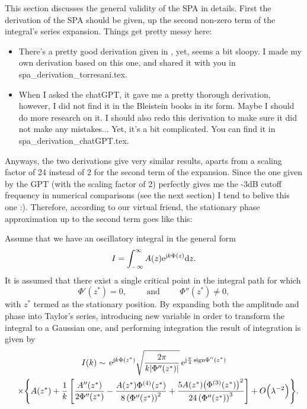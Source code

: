 \documentclass[11pt]{article}
\begin{document}
This section discusses the general validity of the SPA in details.
First the derivation of the SPA should be given, up the second non-zero term of the integral's series expansion.
Things get pretty messy here:
\begin{itemize}
\item There's a pretty good derivation given in \cite[p. 114-116]{torresani1995}, yet, seems a bit sloopy.
I made my own derivation based on this one, and shared it with you in spa\_derivation\_torresani.tex.
\item When I asked the chatGPT, it gave me a pretty thorough derivation, however, I did not find it in the Bleistein books in its form.
Maybe I should do more research on it. 
I should also redo this derivation to make sure it did not make any mistakes... Yet, it's a bit complicated. 
You can find it in spa\_derivation\_chatGPT.tex.
\end{itemize}
Anyways, the two derivations give very similar results, aparts from a scaling factor of 24 instead of 2 for the second term of the expansion.
Since the one given by the GPT (with the scaling factor of 2) perfectly gives me the -3dB cutoff frequency in numerical comparisons (see the next section) I tend to belive this one :).
Therefore, according to our virtual friend, the stationary phase approximation up to the second term goes like this:

Assume that we have an oscillatory integral in the general form
\begin{equation}
    I = \int_{-\infty}^{\infty} A(z) \mathrm{e}^{ \mathrm{j} k \Phi(z) }  \mathrm{d} z.
\end{equation}
It is assumed that there exist a single critical point in the integral path for which
\begin{equation}
    \Phi'(z^*) = 0, \hspace{1cm} \text{and} \hspace{1cm} \Phi''(z^*) \neq 0,
\end{equation}
with $z^*$ termed as the stationary position. 
By expanding both the amplitude and phase into Taylor's series, introducing new variable in order to transform the integral to a Gaussian one, and performing integration the result of integration is given by
\begin{multline}
    \label{eq:result}
    \footnotesize
    I(k)\sim\,  \mathrm{e}^{\mathrm{j} k \Phi(z^*)}\sqrt{\frac{2\pi}{k|\Phi''(z^*)|}}\,\mathrm{e}^{\mathrm{j}\frac{\pi}{4}\,\text{sign}\Phi''(z^*)} \\
    \quad \times \Biggl\{ A(z^*) + \frac{1}{k}\left[\frac{A''(z^*)}{2\Phi''(z^*)}
    -\frac{A(z^*)\Phi^{(4)}(z^*)}{8\left(\Phi''(z^*)\right)^2}+\frac{5A(z^*)\bigl(\Phi^{(3)}(z^*)\bigr)^2}
    {24\left(\Phi''(z^*)\right)^3}\right] + O\Bigl(\lambda^{-2}\Bigr) \Biggr\}.
\end{multline}
\end{document}
